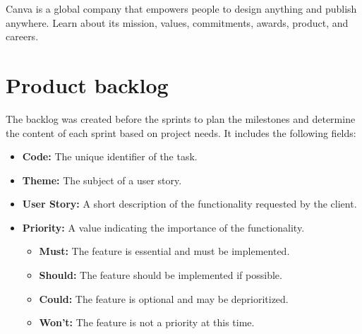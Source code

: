 Canva is a global company that empowers people to design anything and publish anywhere. Learn about its mission, values, commitments, awards, product, and careers.

\section{Product backlog}

The backlog was created before the sprints to plan the milestones and determine the content of each sprint based on project needs. It includes the following fields:
\begin{itemize}
    \item \textbf{Code:} The unique identifier of the task.
    \item \textbf{Theme:} The subject of a user story.
    \item \textbf{User Story:} A short description of the functionality requested by the client.
    \item \textbf{Priority:} A value indicating the importance of the functionality.
    \begin{itemize}
        \item \textbf{Must:} The feature is essential and must be implemented.
        \item \textbf{Should:} The feature should be implemented if possible.
        \item \textbf{Could:} The feature is optional and may be deprioritized.
        \item \textbf{Won't:} The feature is not a priority at this time.
    \end{itemize}
\end{itemize}

